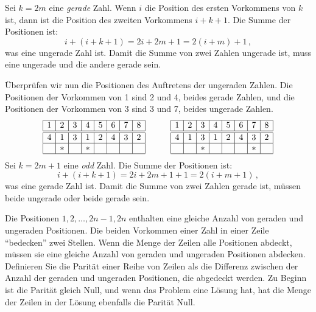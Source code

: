 Sei $k=2m$ eine \emph{gerade} Zahl. Wenn $i$ die Position des ersten Vorkommens von $k$ ist, dann ist die Position des zweiten Vorkommens $i+k+1$.
Die Summe der Positionen ist:
\[
i+(i+k+1)=2i+2m+1=2(i+m)+1\,,
\]
was eine ungerade Zahl ist. Damit die Summe von zwei Zahlen ungerade ist, muss eine ungerade und die andere gerade sein.

Überprüfen wir nun die Positionen des Auftretens der ungeraden Zahlen. Die Positionen der Vorkommen von 1 sind 2 und 4, beides gerade Zahlen, und die Positionen der Vorkommen von 3 sind 3 und 7, beides ungerade Zahlen.
\[
\begin{array}{|c|c|c|c|c|c|c|c|}
\hline
1&2&3&4&5&6&7&8\\
\hline\hline
4&1&3&1&2&4&3&2\\\hline
&*&&*&&&&\\\hline
\end{array}
\hspace{3em}
\begin{array}{|c|c|c|c|c|c|c|c|}
\hline
1&2&3&4&5&6&7&8\\
\hline\hline
4&1&3&1&2&4&3&2\\\hline
&&*&&&&*&\\\hline
\end{array}
\]
Sei $k=2m+1$ eine \emph{odd} Zahl. Die Summe der Positionen ist:
\[
i+(i+k+1)=2i+2m+1+1=2(i+m+1)\,,
\]
was eine gerade Zahl ist. Damit die Summe von zwei Zahlen gerade ist, müssen beide ungerade oder beide gerade sein.

Die Positionen $1,2,\ldots,2n-1,2n$ enthalten eine gleiche Anzahl von geraden und ungeraden Positionen. Die beiden Vorkommen einer Zahl in einer Zeile ``bedecken'' zwei Stellen. Wenn die Menge der Zeilen alle Positionen abdeckt, müssen sie eine gleiche Anzahl von geraden und ungeraden Positionen abdecken. Definieren Sie die Parität einer Reihe von Zeilen als die Differenz zwischen der Anzahl der geraden und ungeraden Positionen, die abgedeckt werden. Zu Beginn ist die Parität gleich Null, und wenn das Problem eine Lösung hat, hat die Menge der Zeilen in der Lösung ebenfalls die Parität Null.

